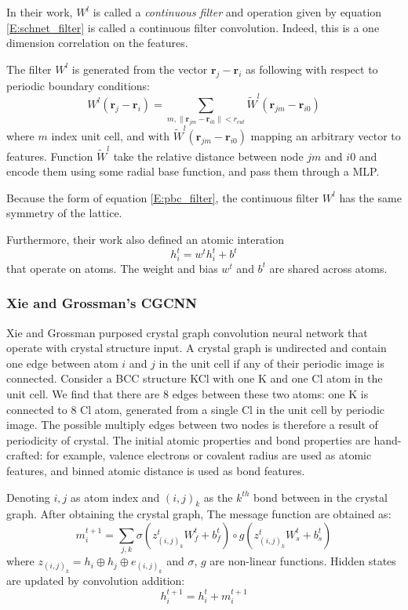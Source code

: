 \documentclass{article}
\begin{document}
In their work, $W^l$ is called a \emph{continuous filter} and operation given by 
equation \eqref{E:schnet_filter} is called a continuous filter convolution. Indeed, this is a 
one dimension correlation on the features. 

The filter $W^l$ is generated from the vector $\mathbf{r}_j - \mathbf{r}_i$ as following 
with respect to periodic boundary conditions:
\begin{equation}
    \label{E:pbc_filter}
    W^l(\mathbf{r}_j - \mathbf{r}_i) 
    = \sum_{m, \|\mathbf{r}_{jm} - \mathbf{r}_{i0}\|<r_{cut}} \tilde{W}^l(\mathbf{r}_{jm} - \mathbf{r}_{i0})
\end{equation}
where $m$ index unit cell,
and with $\tilde{W}^l(\mathbf{r}_{jm} - \mathbf{r}_{i0})$ mapping an arbitrary vector to features. 
Function $\tilde{W}^l$ take the relative distance between node $jm$ and $i0$ and encode them 
using some radial base function, and pass them through a MLP. 

Because the form of equation \eqref{E:pbc_filter}, the continuous filter $W^l$ has the same 
symmetry of the lattice.

Furthermore, their work also defined an atomic interation 
\begin{equation}
    h^t_{i} = w^t h_i^t + b^t
\end{equation}
that operate on atoms. The weight and bias $w^t$ and $b^t$ are shared across atoms.

\subsubsection{Xie and Grossman's CGCNN}
Xie and Grossman purposed crystal graph convolution neural network\cite{CGCNN} that operate with 
crystal structure input. A crystal graph is undirected and contain one edge between 
atom $i$ and $j$ in the unit cell if any of their periodic image is connected. 
Consider a BCC structure KCl with one K and one Cl atom in the unit cell. We find 
that there are 8 edges between these two atoms: one K is connected to 8 Cl atom,
generated from a single Cl in the unit cell by periodic image. The possible multiply edges 
between two nodes is therefore a result of periodicity of crystal.
The initial atomic properties and bond properties are hand-crafted: 
for example, valence electrons or covalent radius are used as atomic features, and 
binned atomic distance is used as bond features.

Denoting $i,j$ as atom index and $(i,j)_k$ as the $k^{th}$ bond
between in the crystal graph. 
After obtaining the crystal graph, The message function are obtained as:
\begin{equation}
    m_i^{t+1} = \sum_{j,k} \sigma(z^t_{(i,j)_k}W_f^{t} + b_f^t) \circ g(z^t_{(i,j)_k}W_s^{t} + b_s^t)
\end{equation}
where $z_{(i,j)_k} = h_i \oplus h_j \oplus e_{(i,j)_k}$ and $\sigma$, $g$ are 
non-linear functions. 
Hidden states are updated by convolution addition:
\begin{equation}
    h_i^{t+1} = h_i^t + m_i^{t+1}
\end{equation}
\end{document}
